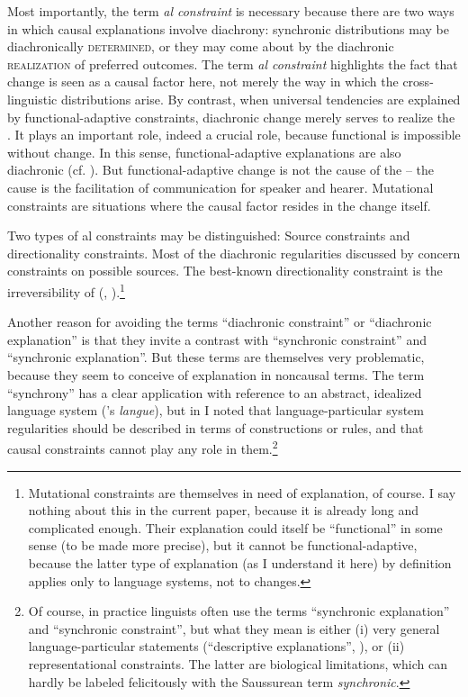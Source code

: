\documentclass[output=paper]{langsci/langscibook}
\begin{document}
Most importantly, the term \textit{al constraint} is necessary because there are two ways in which causal explanations involve diachrony: synchronic distributions may be diachronically \textsc{determined}, or they may come about by the diachronic \textsc{realization} of preferred outcomes. The term \textit{al constraint} highlights the fact that change is seen as a causal factor here, not merely the way in which the cross-linguistic distributions arise. By contrast, when universal tendencies are explained by functional-adaptive constraints, diachronic change merely serves to realize the .\label{p:haspelmath:merelyserve} 
It plays an important role, indeed a crucial role, because functional  is impossible without change. In this sense, functional-adaptive explanations are also diachronic (cf. \citealt{Haspelmath1999_Opt}). But functional-adaptive change is not the cause of the  – the cause is the facilitation of communication for speaker and hearer. Mutational constraints are situations where the causal factor resides in the change itself.

Two types of al constraints may be distinguished: Source constraints and directionality constraints. Most of the diachronic regularities discussed by \citet{Cristofaro2017} concern constraints on possible sources. The best-known directionality constraint is the irreversibility of  (\citealt{Haspelmath1999_Irrev}, \citeyear*{ Haspelmath2004_Direction}).\footnote{Mutational constraints 
\label{fn:haspelmath:mutationalconstraints}
are themselves in need of explanation, of course. I say nothing about this in the current paper, because it is already long and complicated enough. Their explanation could itself be “functional” in some sense (to be made more precise), but it cannot be functional-adaptive, because the latter type of explanation (as I understand it here) by definition applies only to language systems, not to changes.} 

Another reason for avoiding the terms “diachronic constraint” or “diachronic explanation” is that they invite a contrast with “synchronic constraint” and “synchronic explanation”. But these terms are themselves very problematic, because they seem to conceive of explanation in noncausal terms. The term “synchrony” has a clear application with reference to an abstract, idealized language system (’s \textit{langue}), but in  I noted that language-particular system regularities should be described in terms of constructions or rules, and that causal constraints cannot play any role in them.\footnote{Of course, in practice linguists often use the terms “synchronic explanation” and “synchronic constraint”, but what they mean is either (i) very general language-particular statements (“descriptive explanations”, ), or (ii) representational constraints. The latter are biological limitations, which can hardly be labeled felicitously with the Saussurean  term \textit{synchronic}.} 
\end{document}
